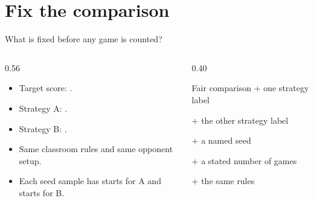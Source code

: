 \section{Fix the comparison}
\begin{frame}{What is fixed before any game is counted?}
\begin{columns}[T]
\begin{column}{0.56\textwidth}
\begin{itemize}
\item Target score: \textbf{\NTargetScore}.
\item Strategy A: \texttt{\NStrategyA}.
\item Strategy B: \texttt{\NStrategyB}.
\item Same classroom rules and same opponent setup.
\item Each seed sample has \textbf{\NInitialStartsA} starts for A and \textbf{\NInitialStartsB} starts for B.
\end{itemize}
\end{column}
\begin{column}{0.40\textwidth}
\begin{block}{Fair comparison}
+ one strategy label\par
+ the other strategy label\par
+ a named seed\par
+ a stated number of games\par
+ the same rules
\end{block}
\end{column}
\end{columns}
\end{frame}

